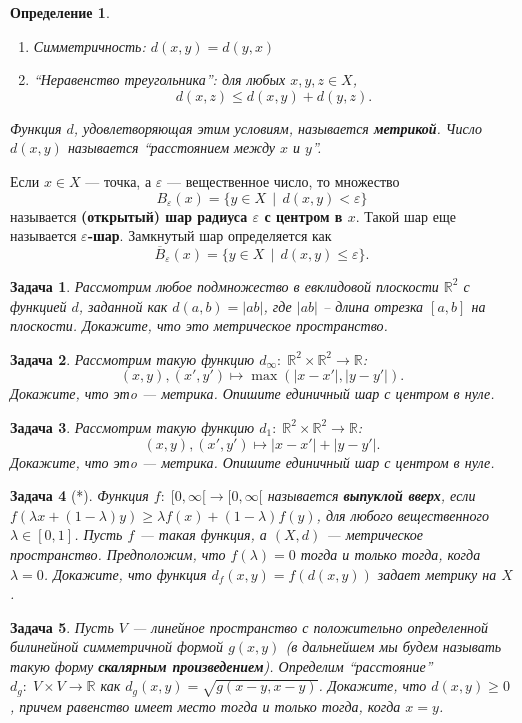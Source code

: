 \documentclass[12pt]{book}
\renewcommand{\epsilon}{\varepsilon}
\def\R{{\mathbb R}}
\theoremstyle{upshape}
\newtheorem{zadacha}{Задача}[chapter]
\theoremstyle{generic}
\newtheorem{opredelenie}[teorema]{Определение}
\theoremstyle{upshapenonumber}
\newcommand{\следствие}{%
     \refstepcounter{teorema}
     {\noindent\bf Следствие \thechapter.\arabic{teorema}:\ }}
\newcommand{\пример}{%
     \refstepcounter{teorema}
     {\noindent\bf Пример \thechapter.\arabic{teorema}:\ }}
\newcommand{\лемма}{%
     \refstepcounter{teorema}
     {\noindent\bf Лемма \thechapter.\arabic{teorema}:\ }}
\newcommand{\теорема}{%
     \refstepcounter{teorema}
     {\noindent\bf Теорема \thechapter.\arabic{teorema}:\ }}
\newcommand{\утверждение}{%
     \refstepcounter{teorema}
     {\noindent\bf Утверждение \thechapter.\arabic{teorema}:\ }}
\begin{document}
{\begin{opredelenie}
\begin{enumerate}
\item Симметричность: $d(x, y) = d (y, x)$

\item ``Неравенство треугольника'': для любых $x, y, z \in X$,
$$
d(x,z) \leq  d(x,y) + d(y,z).
$$
\end{enumerate}
Функция $d$, удовлетворяющая этим условиям, называется {\bf
метрикой}. Число $d(x,y)$ называется ``расстоянием между $x$ и
$y$''.
\end{opredelenie}

Если $x\in X$ --- точка, а $\epsilon$ --- вещественное число, то
множество
$$ 
B_\epsilon(x) = \{ y \in X \ \  | \ \  d(x,y)< \epsilon\}
$$
называется {\bf (открытый) шар радиуса $\epsilon$ с центром в $x$}.
Такой шар еще называется {\bf $\epsilon$-шар}.  Замкнутый шар
определяется как
$$ 
\overline B_\epsilon(x) = \{ y \in X \ \  | \ \  d(x,y)\leq \epsilon\}.
$$

\begin{zadacha} Рассмотрим любое подмножество в евклидовой плоскости
$\R^2$ с функцией $d$, заданной как $d(a, b)= |ab|$, где $|ab|$ --
длина отрезка $[a, b]$ на плоскости. Докажите, что это метрическое
пространство.
\end{zadacha}

\begin{zadacha} Рассмотрим такую функцию $d_\infty:\;\R^2\times \R^2
\to \R$:
$$
(x, y), (x', y') \mapsto \max (|x-x'|, |y-y'|).
$$
Докажите, что этo --- метрика. Опишите единичный шар с центром в нуле.
\end{zadacha}

\begin{zadacha} Рассмотрим такую функцию $d_1:\;\R^2\times \R^2 \to \R$:
$$
(x, y), (x', y') \mapsto |x-x'|+ |y-y'|.
$$
Докажите, что этo --- метрика. Опишите единичный шар с центром в нуле.
\end{zadacha}

\begin{zadacha}[*] Функция $f:\; [0, \infty[ \to [0, \infty[$ называется
{\bf выпуклой вверх}, если $f(\lambda x+ (1-\lambda) y)
\geq \lambda f(x) + (1-\lambda)f(y)$,
для любого вещественного $\lambda\in [0,1]$. 
Пусть $f$ --- такая функция, а $(X, d)$ --- метрическое пространство.
Предположим, что $f(\lambda)=0$ тогда и только тогда, когда $\lambda
= 0$. Докажите, что функция $d_f(x,y) = f(d(x,y))$ задает метрику на
$X$.
\end{zadacha}

\begin{zadacha} Пусть $V$ --- линейное пространство с 
положительно определенной билинейной симметричной формой $g(x,y)$ (в
дальнейшем мы будем называть такую форму {\bf скалярным
произведением}). Определим ``расстояние'' $d_g:\; V\times V \to \R$
как $d_g(x, y) = \sqrt{g(x-y, x-y)}$. Докажите, что $d(x,y)\geq 0$,
причем равенство имеет место тогда и только тогда, когда $x=y$.
\end{zadacha}

}
\end{document}
